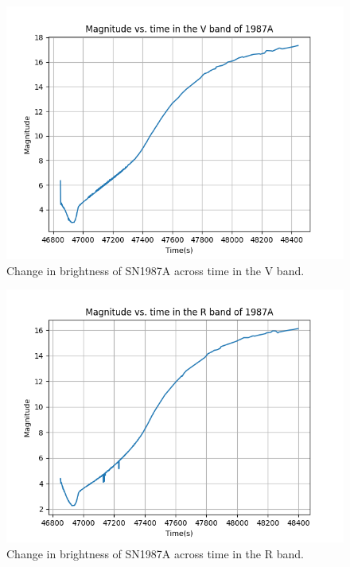 \begin{figure}[h]
	\includegraphics[width=1.0\textwidth]{1987A_V_magvstime.png}
	\caption{Change in brightness of SN1987A across time in the V band.}
\end{figure}
\begin{figure}[h]
	\includegraphics[width=1.0\textwidth]{1987A_R_magvstime.png}
	\caption{Change in brightness of SN1987A across time in the R band.}
\end{figure}
